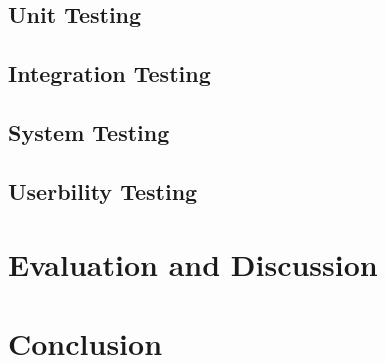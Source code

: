 \documentclass[11pt]{article}
\begin{document}
\subsection{Unit Testing} \label{unit-testing}

\subsection{Integration Testing} \label{integration-testing}

\subsection{System Testing} \label{system-testing}

\subsection{Userbility Testing} \label{usability-testing}


\section{Evaluation and Discussion} \label{evaluation-discussion}

\section{Conclusion} \label{conclusion}


%
 
\end{document}
